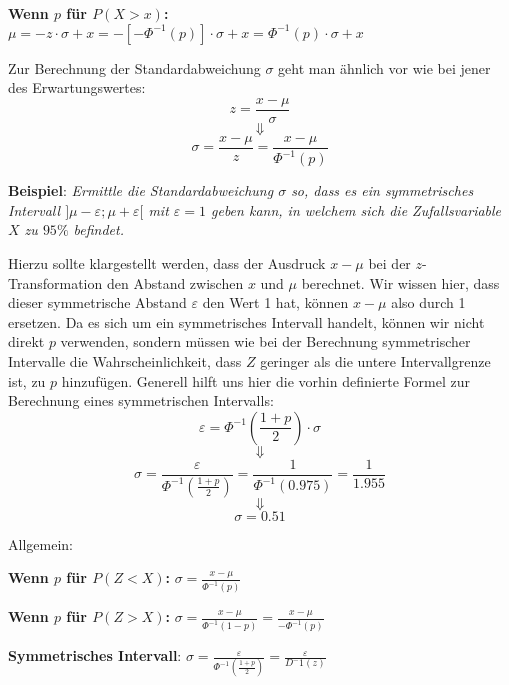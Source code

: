 \textbf{Wenn $p$ f\"{u}r $P(X > x)$:} $\mu = -z \cdot \sigma + x = -[-\Phi^{-1}(p)] \cdot \sigma + x = \Phi^{-1}(p) \cdot \sigma + x$

\pagebreak


Zur Berechnung der Standardabweichung $\sigma$ geht man \"{a}hnlich vor wie bei jener des Erwartungswertes: $$z = \frac{x - \mu}{\sigma}$$ $$\Downarrow$$ $$ \sigma = \frac{x - \mu}{z} = \frac{x - \mu}{\Phi^{-1}(p)}$$

\textbf{Beispiel}: \emph{Ermittle die Standardabweichung $\sigma$ so, dass es ein symmetrisches Intervall $]\mu - \varepsilon ; \mu + \varepsilon[$ mit $\varepsilon = 1$ geben kann, in welchem sich die Zufallsvariable $X$ zu $95 \%$ befindet.}

Hierzu sollte klargestellt werden, dass der Ausdruck $x - \mu$ bei der $z$-Transformation den Abstand zwischen $x$ und $\mu$ berechnet. Wir wissen hier, dass dieser symmetrische Abstand $\varepsilon$ den Wert 1 hat, k\"{o}nnen $x-\mu$ also durch 1 ersetzen. Da es sich um ein symmetrisches Intervall handelt, k\"{o}nnen wir nicht direkt $p$ verwenden, sondern m\"{u}ssen wie bei der Berechnung symmetrischer Intervalle die Wahrscheinlichkeit, dass $Z$ geringer als die untere Intervallgrenze ist, zu $p$ hinzuf\"{u}gen. Generell hilft uns hier die vorhin definierte Formel zur Berechnung eines symmetrischen Intervalls: $$\varepsilon = \Phi^{-1}\left(\frac{1 + p}{2}\right) \cdot \sigma$$ $$\Downarrow$$ $$\sigma = \frac{\varepsilon}{\Phi^{-1}\left(\frac{1 + p}{2}\right)} = \frac{1}{\Phi^{-1}(0.975)} = \frac{1}{1.955}$$ $$\Downarrow$$ $$\sigma = 0.51$$

Allgemein:

\textbf{Wenn $p$ f\"{u}r $P(Z < X)$:} $\sigma = \frac{x - \mu}{\Phi^{-1}(p)}$

\textbf{Wenn $p$ f\"{u}r $P(Z > X)$:} $\sigma = \frac{x - \mu}{\Phi^{-1}(1 - p)} = \frac{x - \mu}{-\Phi^{-1}(p)}$

\textbf{Symmetrisches Intervall}: $\sigma = \frac{\varepsilon}{\Phi^{-1}\left(\frac{1 + p}{2}\right)} = \frac{\varepsilon}{D^-1(z)}$

